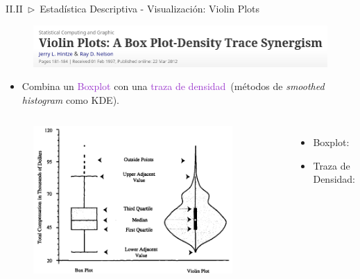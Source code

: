 \documentclass[xcolor=dvipsnames]{beamer}
\begin{document}
    \begin{frame}{II.II~$\rhd$~Estadística Descriptiva - Visualización: Violin Plots}
        \begin{figure}
            \centering
            \includegraphics[width=\textwidth]{imgs/violin/title.png}
        \end{figure}%
        \begin{itemize}
            \item Combina un \textcolor{DarkOrchid}{Boxplot} con una \textcolor{DarkOrchid}{traza de densidad}~(métodos de \textit{smoothed histogram} como KDE).
        \end{itemize}%
        \begin{columns}
                \begin{figure}
                \centering
                \includegraphics[width=0.9\textwidth]{imgs/violin/plot_01.png}
                \end{figure}
                \begin{itemize}
                    \item Boxplot:%
                    \item Traza de Densidad:%
                \end{itemize}
        \end{columns}
    \end{frame}
\end{document}
